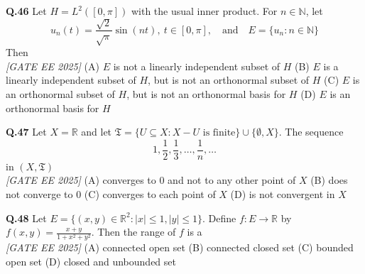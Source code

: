 \documentclass[11pt]{article}
\begin{document}
\begin{flushleft}
\textbf{Q.46} Let $H = L^2([0, \pi])$ with the usual inner product. For $n \in \mathbb{N}$, let \newline
\[
u_n(t) = \frac{\sqrt{2}}{\sqrt{\pi}} \sin(n t),\ t \in [0, \pi], \quad \text{and} \quad E = \{u_n : n \in \mathbb{N}\}
\]
Then 
\\[1ex] \textit{[GATE EE 2025]}
\newline
(A) $E$ is not a linearly independent subset of $H$ \newline
(B) $E$ is a linearly independent subset of $H$, but is not an orthonormal subset of $H$ \newline
(C) $E$ is an orthonormal subset of $H$, but is not an orthonormal basis for $H$ \newline
(D) $E$ is an orthonormal basis for $H$ \newline
\end{flushleft}

\begin{flushleft}
\textbf{Q.47} Let $X = \mathbb{R}$ and let $\mathfrak{T} = \{U \subseteq X : X - U \text{ is finite}\} \cup \{\emptyset, X\}$. The sequence \newline
\[
1, \frac{1}{2}, \frac{1}{3}, \dots, \frac{1}{n}, \dots
\]
in $(X, \mathfrak{T})$
\\[1ex] \textit{[GATE EE 2025]}
\newline
(A) converges to 0 and not to any other point of $X$ \newline
(B) does not converge to 0 \newline
(C) converges to each point of $X$ \newline
(D) is not convergent in $X$ \newline
\end{flushleft}

\begin{flushleft}
\textbf{Q.48} Let $E = \{(x, y) \in \mathbb{R}^2 : |x| \leq 1, |y| \leq 1\}$. Define $f : E \to \mathbb{R}$ by $f(x, y) = \frac{x + y}{1 + x^2 + y^2}$. \newline
Then the range of $f$ is a
\\[1ex] \textit{[GATE EE 2025]}
\newline
(A) connected open set \hspace{3em} (B) connected closed set \newline
(C) bounded open set \hspace{3em} (D) closed and unbounded set \newline
\end{flushleft}
\end{document}
